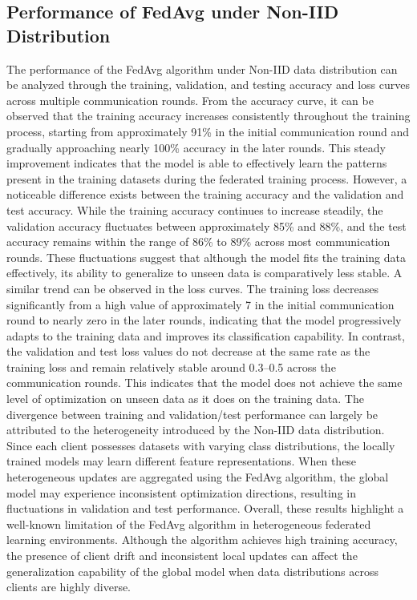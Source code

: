 \documentclass[12pt]{book}
\begin{document}
\subsection{ Performance of FedAvg under Non-IID Distribution}
The performance of the FedAvg algorithm under Non-IID data distribution can be analyzed through the training, validation, and testing accuracy and loss curves across multiple communication rounds. From the accuracy curve, it can be observed that the training accuracy increases consistently throughout the training process, starting from approximately 91\% in the initial communication round and gradually approaching nearly 100\% accuracy in the later rounds. This steady improvement indicates that the model is able to effectively learn the patterns present in the training datasets during the federated training process.
However, a noticeable difference exists between the training accuracy and the validation and test accuracy. While the training accuracy continues to increase steadily, the validation accuracy fluctuates between approximately 85\% and 88\%, and the test accuracy remains within the range of 86\% to 89\% across most communication rounds. These fluctuations suggest that although the model fits the training data effectively, its ability to generalize to unseen data is comparatively less stable.
A similar trend can be observed in the loss curves. The training loss decreases significantly from a high value of approximately 7 in the initial communication round to nearly zero in the later rounds, indicating that the model progressively adapts to the training data and improves its classification capability. In contrast, the validation and test loss values do not decrease at the same rate as the training loss and remain relatively stable around 0.3–0.5 across the communication rounds. This indicates that the model does not achieve the same level of optimization on unseen data as it does on the training data.
The divergence between training and validation/test performance can largely be attributed to the heterogeneity introduced by the Non-IID data distribution. Since each client possesses datasets with varying class distributions, the locally trained models may learn different feature representations. When these heterogeneous updates are aggregated using the FedAvg algorithm, the global model may experience inconsistent optimization directions, resulting in fluctuations in validation and test performance.
Overall, these results highlight a well-known limitation of the FedAvg algorithm in heterogeneous federated learning environments. Although the algorithm achieves high training accuracy, the presence of client drift and inconsistent local updates can affect the generalization capability of the global model when data distributions across clients are highly diverse.
\end{document}
